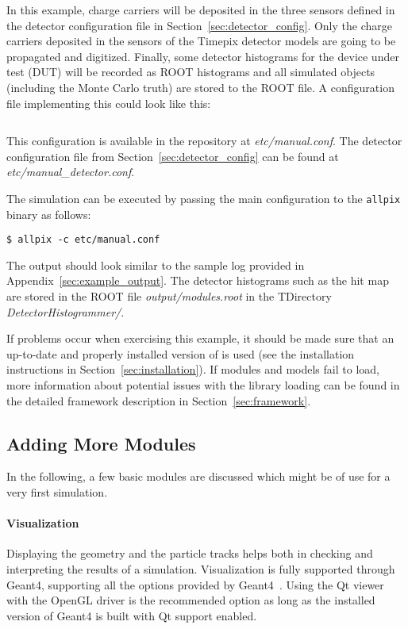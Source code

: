 In this example, charge carriers will be deposited in the three sensors defined in the detector configuration file in Section~\ref{sec:detector_config}.
Only the charge carriers deposited in the sensors of the Timepix detector models are going to be propagated and digitized.
Finally, some detector histograms for the device under test (DUT) will be recorded as ROOT histograms and all simulated objects (including the Monte Carlo truth) are stored to the \apsq ROOT file.
A configuration file implementing this could look like this:
\inputminted[frame=single,framesep=3pt,breaklines=true,tabsize=2,linenos]{ini}{../../etc/manual.conf}

This configuration is available in the repository at \textit{etc/manual.conf}.
The detector configuration file from Section~\ref{sec:detector_config} can be found at \textit{etc/manual\_detector.conf}.

The simulation can be executed by passing the main configuration to the \texttt{allpix} binary as follows:
\begin{verbatim}
$ allpix -c etc/manual.conf
\end{verbatim}
The output should look similar to the sample log provided in Appendix~\ref{sec:example_output}.
The detector histograms such as the hit map are stored in the ROOT file \textit{output/modules.root} in the TDirectory \textit{DetectorHistogrammer/}.

If problems occur when exercising this example, it should be made sure that an up-to-date and properly installed version of \apsq is used (see the installation instructions in Section~\ref{sec:installation}).
If modules and models fail to load, more information about potential issues with the library loading can be found in the detailed framework description in Section~\ref{sec:framework}.

\subsection{Adding More Modules}
In the following, a few basic modules are discussed which might be of use for a very first simulation.

\paragraph{Visualization}
Displaying the geometry and the particle tracks helps both in checking and interpreting the results of a simulation.
Visualization is fully supported through Geant4, supporting all the options provided by Geant4~\cite{geant4vis}.
Using the Qt viewer with the OpenGL driver is the recommended option as long as the installed version of Geant4 is built with Qt support enabled.

